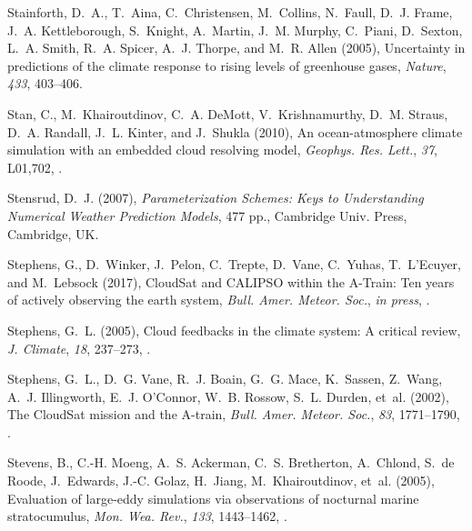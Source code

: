 \documentclass[draft]{agujournal}
\begin{document}
\begin{thebibliography}{196}
Stainforth, D.~A., T.~Aina, C.~Christensen, M.~Collins, N.~Faull, D.~J. Frame,
  J.~A. Kettleborough, S.~Knight, A.~Martin, J.~M. Murphy, C.~Piani, D.~Sexton,
  L.~A. Smith, R.~A. Spicer, A.~J. Thorpe, and M.~R. Allen (2005), Uncertainty
  in predictions of the climate response to rising levels of greenhouse gases,
  \textit{Nature}, \textit{433}, 403--406.

Stan, C., M.~Khairoutdinov, C.~A. DeMott, V.~Krishnamurthy, D.~M. Straus, D.~A.
  Randall, J.~L. Kinter, and J.~Shukla (2010), An ocean-atmosphere climate
  simulation with an embedded cloud resolving model, \textit{Geophys. Res.
  Lett.}, \textit{37}, L01,702, .

Stensrud, D.~J. (2007), \textit{Parameterization Schemes: Keys to Understanding
  Numerical Weather Prediction Models}, 477 pp., Cambridge Univ. Press,
  Cambridge, UK.

Stephens, G., D.~Winker, J.~Pelon, C.~Trepte, D.~Vane, C.~Yuhas, T.~L'Ecuyer,
  and M.~Lebsock (2017), {CloudSat} and {CALIPSO} within the {A}-{T}rain: {T}en
  years of actively observing the earth system, \textit{Bull. Amer. Meteor.
  Soc.}, \textit{in press}, .

Stephens, G.~L. (2005), Cloud feedbacks in the climate system: A critical
  review, \textit{J. Climate}, \textit{18}, 237--273,
  .

Stephens, G.~L., D.~G. Vane, R.~J. Boain, G.~G. Mace, K.~Sassen, Z.~Wang, A.~J.
  Illingworth, E.~J. O'Connor, W.~B. Rossow, S.~L. Durden, et~al. (2002), The
  {CloudSat} mission and the {A}-train, \textit{Bull. Amer. Meteor. Soc.},
  \textit{83}, 1771--1790, .

Stevens, B., C.-H. Moeng, A.~S. Ackerman, C.~S. Bretherton, A.~Chlond, S.~{de
  Roode}, J.~Edwards, J.-C. Golaz, H.~Jiang, M.~Khairoutdinov, et~al. (2005),
  Evaluation of large-eddy simulations via observations of nocturnal marine
  stratocumulus, \textit{Mon. Wea. Rev.}, \textit{133}, 1443--1462,
  .


\end{thebibliography}
\end{document}
